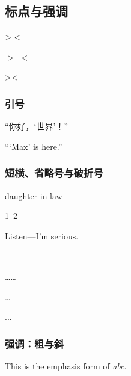 \documentclass{ctexart}
\begin{document}
    \subsection{标点与强调}
            > < 
            
            $>$ $<$ 
            
            \textgreater \textless 
        
            \subsubsection{引号}
            “你好，‘世界’！” 
            
            ``\thinspace`Max' is here.'' 
    
        \subsubsection{短横、省略号与破折号}
            daughter-in-law

            1--2
            
            Listen---I'm serious.
        
            ——
            
            ……
            
            \ldots
            
            ...

	    \subsubsection{强调：粗与斜}
            This is the emphasis form of \emph{abc}.
    
\end{document}
